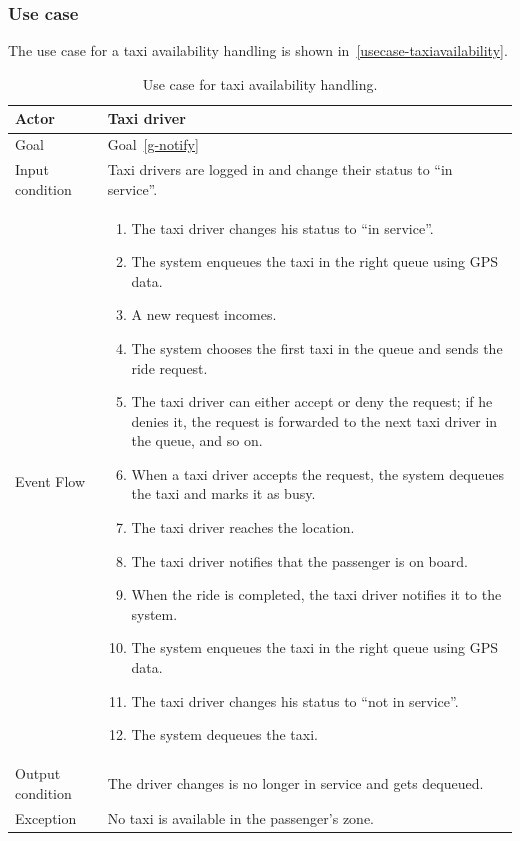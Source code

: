 \subsubsection{Use case}
The use case for a taxi availability handling is shown in~\autoref{usecase-taxiavailability}.

\begin{table}
\begin{center}
\begin{tabular}{| l | p{} |}
\hline
Actor & Taxi driver \\
\hline
Goal & Goal~\ref{g-notify}
\\
\hline
Input condition & Taxi drivers are logged in and change their status to ``in service''.  \\
\hline
Event Flow & \begin{enumerate}
	\item The taxi driver changes his status to ``in service''.
	\item The system enqueues the taxi in the right queue using GPS data.
	\item A new request incomes.
	\item The system chooses the first taxi in the queue and sends the ride request.
	\item The taxi driver can either accept or deny the request; if he denies it, the request is forwarded to the next taxi driver in the queue, and so on.
	\item When a taxi driver accepts the request, the system dequeues the taxi and marks it as busy.
	\item The taxi driver reaches the location.
	\item The taxi driver notifies that the passenger is on board.
	\item When the ride is completed, the taxi driver notifies it to the system.
	\item The system enqueues the taxi in the right queue using GPS data.
	\item The taxi driver changes his status to ``not in service''.
	\item The system dequeues the taxi.
\end{enumerate}
\\
\hline
Output condition & The driver changes is no longer in service and gets dequeued. \\
\hline
Exception & No taxi is available in the passenger's zone. \\
\hline
\end{tabular}
\end{center}
\caption{Use case for taxi availability handling.}
\label{usecase-taxiavailability}
\end{table}

